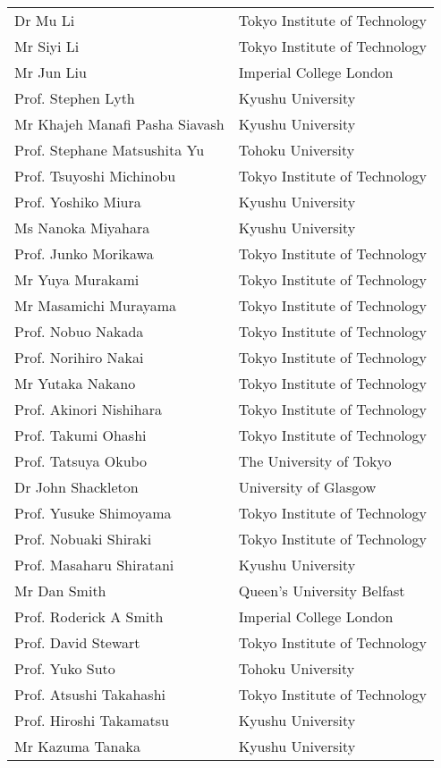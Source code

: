 \begin{longtable}{ll}
Dr Mu Li & Tokyo Institute of Technology \\
Mr  Siyi Li & Tokyo Institute of Technology \\
Mr  Jun Liu & Imperial College London \\
Prof. Stephen Lyth & Kyushu University \\
Mr  Khajeh Manafi Pasha Siavash	& Kyushu University \\
Prof. Stephane Matsushita Yu & Tohoku University \\
Prof. Tsuyoshi Michinobu & Tokyo Institute of Technology \\
Prof. Yoshiko Miura & Kyushu University \\
Ms  Nanoka Miyahara & Kyushu University \\
Prof. Junko Morikawa & Tokyo Institute of Technology \\
Mr  Yuya Murakami & Tokyo Institute of Technology \\
Mr  Masamichi Murayama & Tokyo Institute of Technology \\
Prof. Nobuo Nakada & Tokyo Institute of Technology \\
Prof. Norihiro Nakai & Tokyo Institute of Technology \\
Mr  Yutaka Nakano & Tokyo Institute of Technology \\
Prof. Akinori Nishihara & Tokyo Institute of Technology \\
Prof. Takumi Ohashi & Tokyo Institute of Technology \\
Prof. Tatsuya Okubo & The University of Tokyo \\
Dr John Shackleton & University of Glasgow \\
Prof. Yusuke Shimoyama & Tokyo Institute of Technology \\
Prof. Nobuaki Shiraki & Tokyo Institute of Technology \\
Prof. Masaharu Shiratani & Kyushu University \\
Mr  Dan Smith & Queen's University Belfast \\
Prof. Roderick A Smith & Imperial College London \\
Prof. David Stewart & Tokyo Institute of Technology \\
Prof. Yuko Suto & Tohoku University \\
Prof. Atsushi Takahashi & Tokyo Institute of Technology \\
Prof. Hiroshi Takamatsu & Kyushu University \\
Mr  Kazuma Tanaka & Kyushu University \\

\end{longtable}
